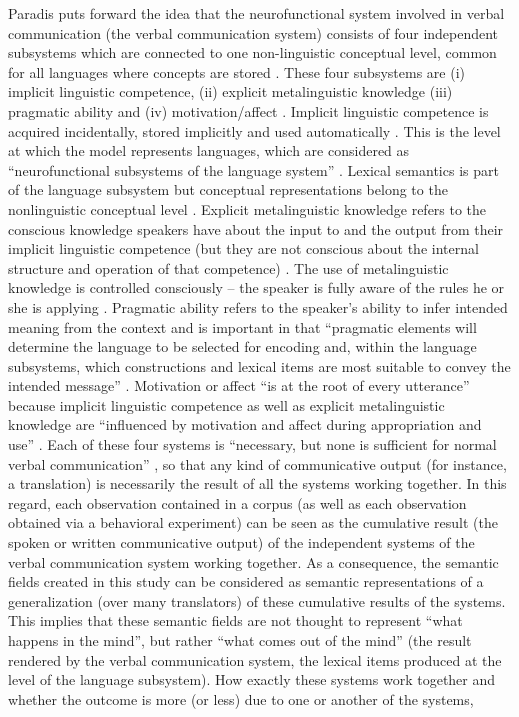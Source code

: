 Paradis puts forward the idea that the neurofunctional system involved in verbal communication (the verbal communication system) consists of four independent subsystems which are connected to one non-linguistic conceptual level, common for all languages where concepts are stored \citep[199]{kecskes_neurofunctional_2007}. These four subsystems are (i) implicit linguistic competence, (ii) explicit metalinguistic knowledge (iii) pragmatic ability and (iv) motivation\slash affect \citep[3]{paradis_neurolinguistic_2004, kecskes_neurofunctional_2007}. Implicit linguistic competence is acquired incidentally, stored implicitly and used automatically \citep[3--4]{kecskes_neurofunctional_2007}. This is the level at which the model represents languages, which are considered as “neurofunctional subsystems of the language system” \citep[225]{kecskes_neurofunctional_2007}. Lexical semantics is part of the language subsystem but conceptual representations belong to the nonlinguistic conceptual level \citep[199]{kecskes_neurofunctional_2007}. Explicit metalinguistic knowledge refers to the conscious knowledge speakers have about the input to and the output from their implicit linguistic competence (but they are not conscious about the internal structure and operation of that competence) \citep[4]{kecskes_neurofunctional_2007}. The use of metalinguistic knowledge is controlled consciously – the speaker is fully aware of the rules he or she is applying \citep[222]{paradis_neurolinguistic_2004}. Pragmatic ability refers to the speaker’s ability to infer intended meaning from the context \citep[4]{kecskes_neurofunctional_2007} and is important in that “pragmatic elements will determine the language to be selected for encoding and, within the language subsystems, which constructions and lexical items are most suitable to convey the intended message” \citep[222]{paradis_neurolinguistic_2004}. Motivation or affect “is at the root of every utterance” \citep[5]{kecskes_neurofunctional_2007} because implicit linguistic competence as well as explicit metalinguistic knowledge are “influenced by motivation and affect during appropriation and use” \citep[222]{paradis_neurolinguistic_2004}. Each of these four systems is “necessary, but none is sufficient for normal verbal communication” \citep[5]{kecskes_neurofunctional_2007}, so that any kind of communicative output (for instance, a translation) is necessarily the result of all the systems working together. In this regard, each observation contained in a corpus (as well as each observation obtained via a behavioral experiment) can be seen as the cumulative result (the spoken or written communicative output) of the independent systems of the verbal communication system working together. As a consequence, the semantic fields created in this study can be considered as semantic representations of a generalization (over many translators) of these cumulative results of the systems. This implies that these semantic fields are not thought to represent ``what happens in the mind'', but rather ``what comes out of the mind'' (the result rendered by the verbal communication system, the lexical items produced at the level of the language subsystem). How exactly these systems work together and whether the outcome is more (or less) due to one or another of the systems, 